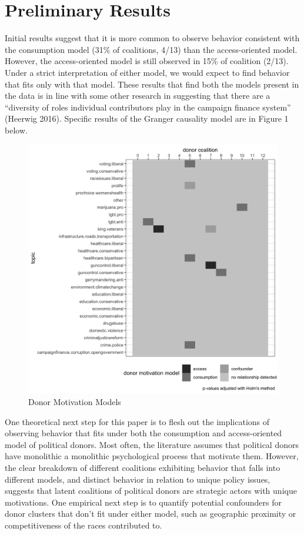 \documentclass[12pt,]{article}
\begin{document}
\hypertarget{preliminary-results}{%
\section{Preliminary Results}\label{preliminary-results}}

Initial results suggest that it is more common to observe behavior
consistent with the consumption model (31\% of coalitions, 4/13) than
the access-oriented model. However, the access-oriented model is still
observed in 15\% of coalition (2/13). Under a strict interpretation of
either model, we would expect to find behavior that fits only with that
model. These results that find both the models present in the data is in
line with some other research in suggesting that there are a ``diversity
of roles individual contributors play in the campaign finance system''
(Heerwig 2016). Specific results of the Granger causality model are in
Figure 1 below.

\begin{figure}
\centering
\includegraphics{../tables_and_figures/aejmc_abstract_1.jpg}
\caption{Donor Motivation Models}
\end{figure}

One theoretical next step for this paper is to flesh out the
implications of observing behavior that fits under both the consumption
and access-oriented model of political donors. Most often, the
literature assumes that political donors have monolithic a monolithic
psychological process that motivate them. However, the clear breakdown
of different coalitions exhibiting behavior that falls into different
models, and distinct behavior in relation to unique policy issues,
suggests that latent coalitions of political donors are strategic actors
with unique motivations. One empirical next step is to quantify
potential confounders for donor clusters that don't fit under either
model, such as geographic proximity or competitiveness of the races
contributed to.
\end{document}
